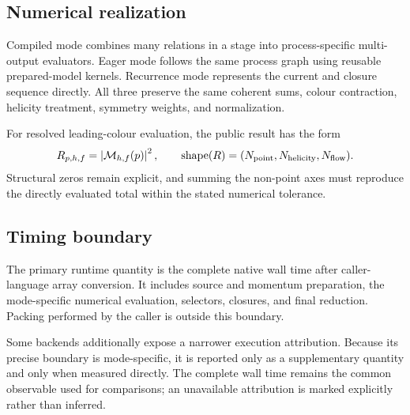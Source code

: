 \subsection{Numerical realization}

Compiled mode combines many relations in a stage into process-specific
multi-output evaluators. Eager mode follows the same process graph using
reusable prepared-model kernels. Recurrence mode represents the current and
closure sequence directly. All three preserve the same coherent sums, colour
contraction, helicity treatment, symmetry weights, and normalization.

For resolved leading-colour evaluation, the public result has the form
\begin{equation}
  R_{p,h,f}=\left|\mathcal M_{h,f}(p)\right|^2,
  \qquad
  \operatorname{shape}(R)=
  (N_{\rm point},N_{\rm helicity},N_{\rm flow}) .
  \label{eq:zgg-resolved-shape}
\end{equation}
Structural zeros remain explicit, and summing the non-point axes must reproduce
the directly evaluated total within the stated numerical tolerance.

\subsection{Timing boundary}

The primary runtime quantity is the complete native wall time after
caller-language array conversion. It includes source and momentum preparation,
the mode-specific numerical evaluation, selectors, closures, and final
reduction. Packing performed by the caller is outside this boundary.

Some backends additionally expose a narrower execution attribution. Because
its precise boundary is mode-specific, it is reported only as a supplementary
quantity and only when measured directly. The complete wall time remains the
common observable used for comparisons; an unavailable attribution is marked
explicitly rather than inferred.
